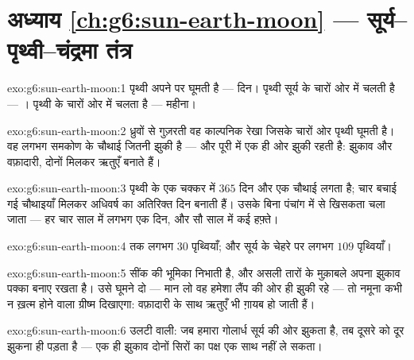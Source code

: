 \section*{अध्याय \ref{ch:g6:sun-earth-moon} --- सूर्य--पृथ्वी--चंद्रमा तंत्र}

\begin{solution}{exo:g6:sun-earth-moon:1}
पृथ्वी अपने  पर घूमती है --- दिन। पृथ्वी सूर्य के चारों ओर 
में चलती है --- ।  पृथ्वी के चारों ओर  में चलता है ---
महीना।
\end{solution}

\begin{solution}{exo:g6:sun-earth-moon:2}
ध्रुवों से गुज़रती वह काल्पनिक रेखा जिसके चारों ओर पृथ्वी घूमती है। वह
लगभग समकोण के चौथाई जितनी झुकी है --- और पूरी  में एक ही ओर झुकी
रहती है: झुकाव और वफ़ादारी, दोनों मिलकर ऋतुएँ बनाते हैं।
\end{solution}

\begin{solution}{exo:g6:sun-earth-moon:3}
पृथ्वी के एक चक्कर में $365$ दिन और एक चौथाई लगता है; चार बचाई गई
चौथाइयाँ मिलकर अधिवर्ष का अतिरिक्त दिन बनाती हैं। उसके बिना पंचांग
 में से खिसकता चला जाता --- हर चार साल में लगभग एक दिन, और सौ साल
में कई हफ़्ते।
\end{solution}

\begin{solution}{exo:g6:sun-earth-moon:4}
 तक लगभग $30$ पृथ्वियाँ; और सूर्य के चेहरे पर लगभग $109$
पृथ्वियाँ।
\end{solution}

\begin{solution}{exo:g6:sun-earth-moon:5}
सींक  की भूमिका निभाती है, और असली  तारों के मुक़ाबले अपना
झुकाव पक्का बनाए रखता है। उसे घूमने दो --- मान लो वह हमेशा लैंप की ओर
ही झुकी रहे --- तो नमूना कभी न ख़त्म होने वाला ग्रीष्म दिखाएगा:
वफ़ादारी के साथ ऋतुएँ भी ग़ायब हो जाती हैं।
\end{solution}

\begin{solution}{exo:g6:sun-earth-moon:6}
उलटी वाली: जब हमारा गोलार्ध सूर्य की ओर झुकता है, तब दूसरे को दूर
झुकना ही पड़ता है --- एक ही झुकाव दोनों सिरों का पक्ष एक साथ नहीं ले
सकता।
\end{solution}

